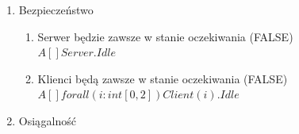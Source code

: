 \documentclass{article}
\begin{document}
		\begin{enumerate}
				
			\item Bezpieczeństwo
			
				\begin{enumerate}
				
					\item Serwer będzie zawsze w stanie oczekiwania (FALSE) \\ $ A[] Server.Idle $
					\item Klienci będą zawsze w stanie oczekiwania (FALSE) \\ $ A[] forall (i:int[0,2]) Client(i).Idle $
				
				\end{enumerate}
			
			\item Osiągalność
			
				\begin{enumerate}


\end{enumerate}
\end{enumerate}
\end{document}
